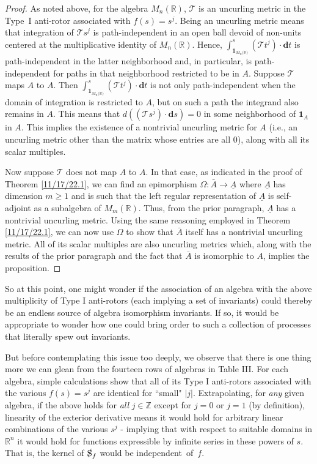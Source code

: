 \documentclass{amsart}
\theoremstyle{definition}
\numberwithin{theorem}{section}
\numberwithin{equation}{section}
\begin{document}
\begin{proof}
As noted above, for the algebra $M_n(\mathbb{R})$, $\mathcal{T}$ is an uncurling metric in the \mbox{Type I} anti-rotor associated with $f(s)=s^j$.  Being an uncurling metric means that integration of $\mathcal{\mathcal{T}}s^j$ is path-independent in an open ball devoid of non-units centered at the multiplicative identity of $ M_n(\mathbb{R})$.  
 Hence, $\int_{\mathbf{1}_{M_n({\mathbb{R})}}}^s (\mathcal{T}t^j)\cdot \mathbf{d}t$ is path-independent in the latter neighborhood and, in particular, is path-independent for paths in that neighborhood restricted to be in $A$.  Suppose $\mathcal{\mathcal{T}}$ maps $A$ to $A$. 
Then $\int_{\mathbf{1}_{M_n({\mathbb{R})}}}^s (\mathcal{T}t^j)\cdot \mathbf{d}t$ is not only path-independent when the domain of integration is restricted to $A$, but on such a path the integrand also remains in $A$.  This means that 
  $d((\mathcal{\mathcal{T}}s^j)\cdot \mathbf{d}s) = 0$ in some neighborhood of $\mathbf{1}_A$ in $A$.  This implies the existence of a nontrivial uncurling metric for $A$ (i.e., an uncurling metric other than the matrix whose entries are all 0), along with all its scalar multiples. 
  
  Now suppose $\mathcal{\mathcal{T}}$ does not map $A$ to $A$. In that case, as indicated in the proof of Theorem \ref{11/17/22.1}, we can find an epimorphism $\Omega:\bar{A}\rightarrow \underline{A}$ where $ \underline{A}$ has dimension $m\ge 1$ and is such that the left regular representation of $\underline{A}$ is self-adjoint as a subalgebra of $M_m(\mathbb{R})$.  Thus, from the prior paragraph, $\underline{A}$ has a nontrivial uncurling metric.  Using the same reasoning employed in Theorem \ref{11/17/22.1}, we can now use  $\Omega$ to show that $\bar{A}$ itself has a nontrivial uncurling metric.  All of its scalar multiples are also uncurling metrics which, along with the results of the prior paragraph and the fact that $\bar{A}$ is isomorphic to $A$, implies the proposition. \end{proof}

 So at this point, one might wonder if the association of an algebra with the above multiplicity of Type I anti-rotors (each implying a set of invariants) could thereby be an endless source of algebra isomorphism invariants.  If so, it would be appropriate to wonder how one could bring order to such a collection of processes that literally spew out invariants.    

But before contemplating this issue too deeply, we observe that
there is one thing more we can glean from the fourteen rows of algebras in Table III.  For each algebra, simple calculations show that all of its Type I anti-rotors associated with the various $f(s)=s^j$ are identical for ``small" $|j|$.  Extrapolating, for {\it any} given algebra, if the above holds for {\it all} $j\in\mathbb{Z}$ except for $j= 0$ or $j=1$ (by definition), linearity of the exterior derivative means it would hold for arbitrary linear combinations of the various $s^j$ - implying that with respect to suitable domains in $\mathbb{R}^n$ it would hold for functions expressible by infinite series in these powers of $s$.  That is, the kernel of $\slashed{\text{S}}_f$ would be \mbox{independent of $f$}.
\end{document}
